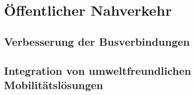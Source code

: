 \section{Öffentlicher Nahverkehr}
\subsection{Verbesserung der Busverbindungen}
\subsection{Integration von umweltfreundlichen Mobilitätslösungen}

